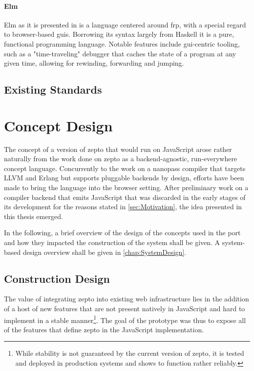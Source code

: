 \documentclass[oneside,11pt,xetex]{scrbook}
\begin{document}
\subsubsection{Elm}

Elm as it is presented in \parencite{CPL} is a language centered around
\gls{frp}, with a special regard to browser-based \gls{gui}s. Borrowing
its syntax largely from Haskell it is a pure, functional programming
language. Notable features include \gls{gui}-centric tooling, such
as a "time-traveling" debugger that caches the state of a program
at any given time, allowing for rewinding, forwarding and jumping.

\section{Existing Standards}


\chapter{Concept Design}
\label{chap:ConceptDesign}

The concept of a version of zepto that would run on JavaScript arose rather
naturally from the work done on zepto as a backend-agnostic, run-everywhere
concept language. Concurrently to the work on a nanopass compiler that
targets LLVM and Erlang but supports pluggable backends by design, efforts
have been made to bring the language into the browser setting. After preliminary
work on a compiler backend that emits JavaScript that was discarded in the
early stages of its development for the reasons stated in \ref{sec:Motivation},
the idea presented in this thesis emerged.

In the following, a brief overview of the design of the concepts used
in the port and how they impacted the construction of the system shall be
given. A system-based design overview shall be given in \ref{chap:SystemDesign}.

\section{Construction Design}
\label{sec:ConstructionDesign}

The value of integrating zepto into existing web infrastructure lies in
the addition of a host of new features that are not present natively in
JavaScript and hard to implement in a stable manner\footnote{While stability
is not guaranteed by the current version of zepto, it is tested and deployed
in production systems and shows to function rather reliably.}. The goal of
the prototype was thus to expose all of the features that define zepto in
the JavaScript implementation.
\end{document}
